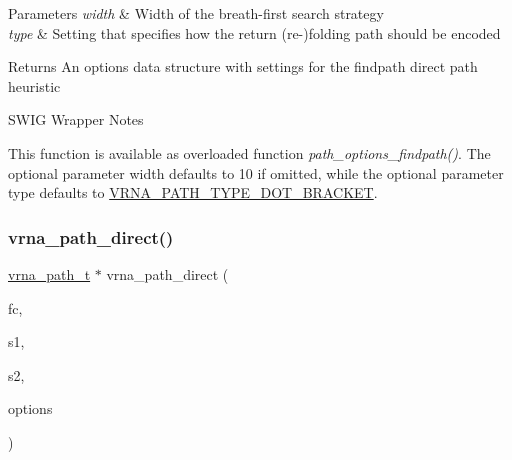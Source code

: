 \begin{DoxyParams}{Parameters}
{\em width} & Width of the breath-\/first search strategy \\
\hline
{\em type} & Setting that specifies how the return (re-\/)folding path should be encoded \\
\hline
\end{DoxyParams}
\begin{DoxyReturn}{Returns}
An options data structure with settings for the findpath direct path heuristic
\end{DoxyReturn}
\begin{DoxyRefDesc}{S\+W\+I\+G Wrapper Notes}
\item[\mbox{\hyperlink{wrappers__wrappers000124}{S\+W\+I\+G Wrapper Notes}}]This function is available as overloaded function {\itshape path\+\_\+options\+\_\+findpath()}. The optional parameter {\ttfamily width} defaults to 10 if omitted, while the optional parameter {\ttfamily type} defaults to \mbox{\hyperlink{group__paths_ga3e964156b52440b65fae5e2a48750d8e}{V\+R\+N\+A\+\_\+\+P\+A\+T\+H\+\_\+\+T\+Y\+P\+E\+\_\+\+D\+O\+T\+\_\+\+B\+R\+A\+C\+K\+ET}}. \end{DoxyRefDesc}
\mbox{\label{group__paths__direct_gacba096caf9a6fe134f33a5afcf2248d8}} 
\subsubsection{\texorpdfstring{vrna\_path\_direct()}{vrna\_path\_direct()}}
{\footnotesize\ttfamily \mbox{\hyperlink{group__paths_ga818d4f3d1cf8723d6905990b08d909fe}{vrna\+\_\+path\+\_\+t}} $\ast$ vrna\+\_\+path\+\_\+direct (\begin{DoxyParamCaption}\item[{\mbox{\hyperlink{group__fold__compound_ga1b0cef17fd40466cef5968eaeeff6166}{vrna\+\_\+fold\+\_\+compound\+\_\+t}} $\ast$}]{fc,  }\item[{const char $\ast$}]{s1,  }\item[{const char $\ast$}]{s2,  }\item[{\mbox{\hyperlink{group__paths_gaa99d8ec48f64de53eda0d51b1ed0d3d1}{vrna\+\_\+path\+\_\+options\+\_\+t}}}]{options }\end{DoxyParamCaption})}



